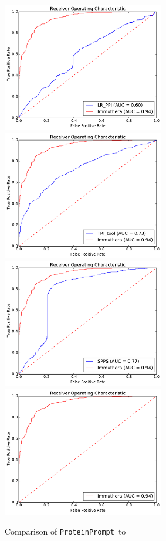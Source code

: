 \documentclass{article}
\newcommand{\tool}{\texttt{ProteinPrompt}}
\begin{document}
\begin{figure}
  \includegraphics[width=200pt]{img/LR_PPI_roc.pdf}
  \includegraphics[width=200pt]{img/TRI_tool_roc.pdf} \\

  \includegraphics[width=200pt]{img/SPPS_roc.pdf}
  \includegraphics[width=200pt]{img/meta_roc.pdf}
  \caption{Comparison of \tool\  to }
  \label{fig:comparison}
\end{figure} 
\end{document}
